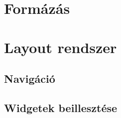 \documentclass[a4paper,10pt]{article}
\begin{document}
\section{Formázás}
\label{sec:format}
\section{Layout rendszer}
\subsection{Navigáció}
\subsection{Widgetek beillesztése}
\end{document}
